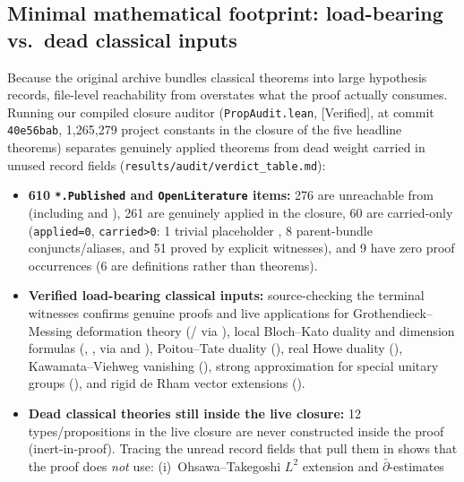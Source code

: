\documentclass[11pt]{article}
\newcommand{\Verified}{\textcolor{verc}{\textsf{\small[Verified]}}}
\theoremstyle{plain}
\theoremstyle{definition}
\begin{document}
\subsection{Minimal mathematical footprint: load-bearing vs.\ dead classical inputs}\label{sec:footprint}

Because the original archive bundles classical theorems into large hypothesis records, file-level
reachability from  overstates what the proof actually consumes. Running our compiled
closure auditor (\texttt{PropAudit.lean}, \Verified{}, at commit \texttt{40e56bab}, 1{,}265{,}279
project constants in the closure of the five headline theorems) separates genuinely applied
theorems from dead weight carried in unused record fields (\texttt{results/audit/verdict\_table.md}):

\begin{itemize}
\item \textbf{610 \texttt{*.Published} and \texttt{OpenLiterature} items:} 276 are unreachable from
   (including  and ), 261 are
  genuinely applied in the closure, 60 are carried-only (\texttt{applied=0}, \texttt{carried>0}:
  1 trivial placeholder , 8 parent-bundle conjuncts/aliases, and 51
  proved by explicit witnesses), and 9 have zero proof occurrences (6 are  definitions
  rather than theorems).
\item \textbf{Verified load-bearing classical inputs:} source-checking the terminal witnesses
  confirms genuine proofs and live applications for Grothendieck--Messing deformation theory
  (/ via
  ), local Bloch--Kato duality and
  dimension formulas (, , 
  via  and ), Poitou--Tate duality (), real Howe
  duality (), Kawamata--Viehweg vanishing (), strong
  approximation for special unitary groups (), and rigid de Rham vector
  extensions ().
\item \textbf{Dead classical theories still inside the live closure:} 12 types/propositions in the
  live closure are never constructed inside the proof (inert-in-proof). Tracing the unread record
  fields that pull them in shows that the proof does \emph{not} use:
  (i)~Ohsawa--Takegoshi $L^2$ extension and $\bar\partial$-estimates

\end{itemize}
\end{document}

